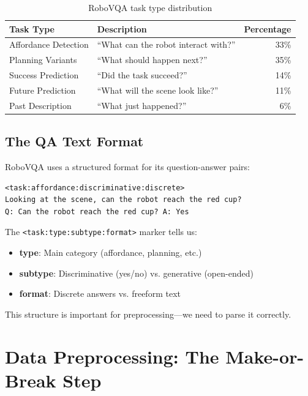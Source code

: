\documentclass[11pt,a4paper]{article}
\begin{document}
\begin{table}[H]
\centering
\begin{tabular}{@{}llr@{}}
\toprule
\textbf{Task Type} & \textbf{Description} & \textbf{Percentage} \\
\midrule
Affordance Detection & ``What can the robot interact with?'' & 33\% \\
Planning Variants & ``What should happen next?'' & 35\% \\
Success Prediction & ``Did the task succeed?'' & 14\% \\
Future Prediction & ``What will the scene look like?'' & 11\% \\
Past Description & ``What just happened?'' & 6\% \\
\bottomrule
\end{tabular}
\caption{RoboVQA task type distribution}
\end{table}

\subsection{The QA Text Format}

RoboVQA uses a structured format for its question-answer pairs:

\begin{lstlisting}[caption=RoboVQA text format]
<task:affordance:discriminative:discrete>
Looking at the scene, can the robot reach the red cup?
Q: Can the robot reach the red cup? A: Yes
\end{lstlisting}

The \texttt{<task:type:subtype:format>} marker tells us:
\begin{itemize}
    \item \textbf{type}: Main category (affordance, planning, etc.)
    \item \textbf{subtype}: Discriminative (yes/no) vs. generative (open-ended)
    \item \textbf{format}: Discrete answers vs. freeform text
\end{itemize}

This structure is important for preprocessing---we need to parse it correctly.

\section{Data Preprocessing: The Make-or-Break Step}
\end{document}
